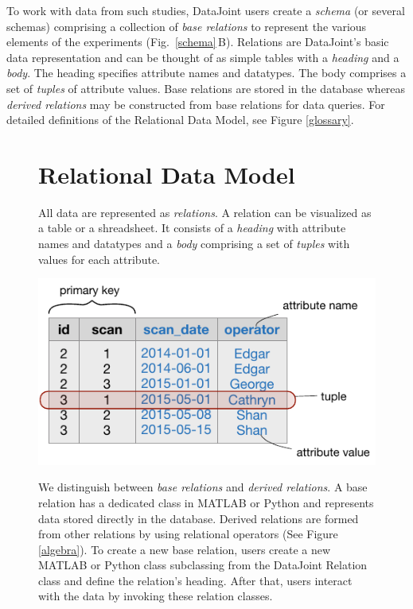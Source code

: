 \documentclass[10pt,letterpaper]{article}
\begin{document}
To work with data from such studies, DataJoint users create a \emph{schema} (or several schemas) comprising a collection of \emph{base relations} to represent the various elements of the experiments (Fig.\ \ref{schema}\,B).
Relations are DataJoint's basic data representation and can be thought of as simple tables with a \emph{heading} and a \emph{body}.
The heading specifies attribute names and datatypes. 
The body comprises a set of \emph{tuples} of attribute values. 
Base relations are stored in the database whereas \emph{derived relations} may be constructed from base relations for data queries.
For detailed definitions of the Relational Data Model, see Figure \ref{glossary}.

\begin{figure}
\begin{adjustwidth}{-1.in}{0in} %
\begin{boxedminipage}{\textwidth}
\section*{Relational Data Model}
\begin{description}
\setlength\itemsep{6pt}
\item[Relation] 
All data are represented as \emph{relations}.  A relation can be visualized as a table or a shreadsheet.  
It consists of a \emph{heading} with attribute names and datatypes and a \emph{body} comprising a set of \emph{tuples} with values for each attribute.

\begin{center}
\includegraphics{./figures/relation.pdf}
\end{center}

We distinguish between \emph{base relations} and \emph{derived relations}.  
A base relation has a dedicated class in MATLAB or Python and represents data stored directly in the database.
Derived relations are formed from other relations by using relational operators (See Figure \ref{algebra}).
To create a new base relation, users create a new MATLAB or Python class subclassing from the DataJoint Relation class and define the relation's heading. 
After that, users interact with the data by invoking these relation classes.


\end{description}
\end{boxedminipage}
\end{adjustwidth}
\end{figure}
\end{document}

